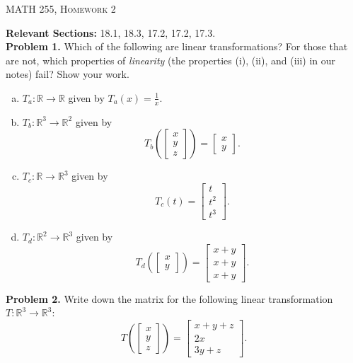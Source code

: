 \documentclass[12pt]{report} %
\newcommand{\R}{\mathbb{R}}
\theoremstyle{definition}
\begin{document}
\begin{center}
   \textsc{\large MATH 255, Homework 2}\\
\end{center}
\vspace{.5cm}

\noindent\textbf{Relevant Sections:} 18.1, 18.3, 17.2, 17.2, 17.3.\\

\noindent\textbf{Problem 1.} Which of the following are linear transformations? For those that are not, which properties of \emph{linearity} (the properties (i), (ii), and (iii) in our notes) fail? Show your work.
\begin{enumerate}[(a)]
    \item $T_a \colon \R \to \R$ given by $T_a(x)=\frac{1}{x}$.
    \item $T_b \colon \R^3 \to \R^2$ given by
    \[
    T_b \left( \begin{bmatrix} x\\ y\\ z \end{bmatrix}\right)
    = \begin{bmatrix} x\\ y \end{bmatrix}.
    \]
    \item $T_c \colon \R \to \R^3$ given by
    \[
    T_c(t)=\begin{bmatrix} t\\ t^2\\ t^3 \end{bmatrix}.
    \]
    \item $T_d \colon \R^2 \to \R^3$ given by
    \[
    T_d\left( \begin{bmatrix} x\\ y \end{bmatrix}\right)
    = \begin{bmatrix} x+y\\ x+y\\ x+y \end{bmatrix}.
    \]
\end{enumerate}

\noindent\textbf{Problem 2.} Write down the matrix for the following linear transformation $T\colon \R^3 \to \R^3$:
\[
T\left( \begin{bmatrix} x\\ y\\ z \end{bmatrix}\right)
= \begin{bmatrix} x+y+z\\ 2x\\ 3y + z \end{bmatrix}.
\]
\end{document}
